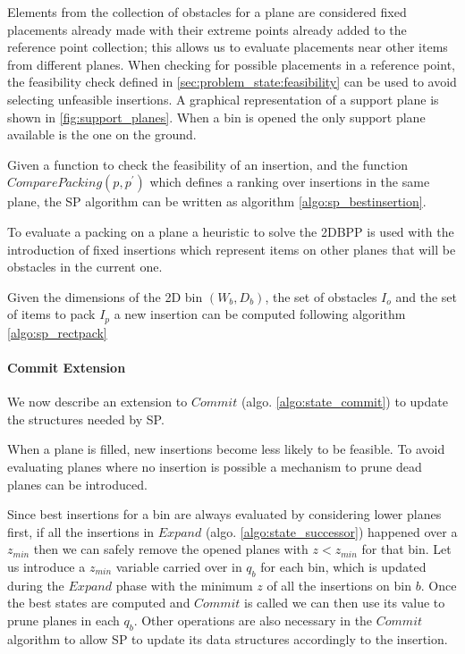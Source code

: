 Elements from the collection of obstacles for a plane are considered fixed placements already made with their extreme points already added to the reference point collection; this allows us to evaluate placements near other items from different planes.
When checking for possible placements in a reference point, the feasibility check defined in \cref{sec:problem_state:feasibility} can be used to avoid selecting unfeasible insertions.
A graphical representation of a support plane is shown in \cref{fig:support_planes}. When a bin is opened the only support plane available is the one on the ground.


Given a function to check the feasibility of an insertion,
and the function $ComparePacking(p, p^\prime)$ which defines a ranking over insertions in the same plane,
the SP algorithm can be written as algorithm \ref{algo:sp_bestinsertion}.



To evaluate a packing on a plane a heuristic to solve the 2DBPP is used with the introduction of fixed insertions which represent items on other planes that will be obstacles in the current one.


Given the dimensions of the 2D bin $(W_b, D_b)$, the set of obstacles $I_{o}$ and the set of items to pack $I_{p}$ a new insertion can be computed following algorithm \ref{algo:sp_rectpack}



\paragraph*{Commit Extension}
We now describe an extension to $Commit$ (algo. \ref{algo:state_commit}) to update the structures needed by SP.

When a plane is filled, new insertions become less likely to be feasible. 
To avoid evaluating planes where no insertion is possible a mechanism to prune dead planes can be introduced.

Since best insertions for a bin are always evaluated by considering lower planes first, if all the insertions in $Expand$ (algo. \ref{algo:state_successor}) happened over a $z_{min}$ then we can safely remove the opened planes with $z < z_{min}$ for that bin.
Let us introduce a $z_{min}$ variable carried over in $q_b$ for each bin, which is updated during the $Expand$ phase with the minimum $z$ of all the insertions on bin $b$.
Once the best states are computed and $Commit$ is called we can then use its value to prune planes in each $q_b$.
Other operations are also necessary in the $Commit$ algorithm to allow SP to update its data structures accordingly to the insertion.

